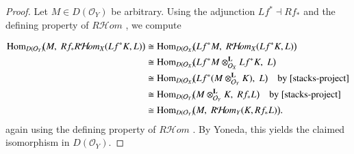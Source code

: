 \documentclass[11pt,twoside]{amsart}
\theoremstyle{plain}
\numberwithin{equation}{section}
\theoremstyle{definition}
\begin{document}
\begin{proof}
Let $M\in D(\mathcal O_Y)$ be arbitrary. Using the adjunction $Lf^*\dashv Rf_*$ \cite[Tag 07A6]{stacks-project}
and the defining property of $R\mathcal H\!om$ \cite[Tag 08J9]{stacks-project}, we compute

\begin{align*}
\operatorname{Hom}_{D(\mathcal O_Y)}\!\bigl(M,\;Rf_*R\mathcal H\!om_X(Lf^*K,L)\bigr)
&\cong \operatorname{Hom}_{D(\mathcal O_X)}\!\bigl(Lf^*M,\;R\mathcal H\!om_X(Lf^*K,L)\bigr) \\
&\cong \operatorname{Hom}_{D(\mathcal O_X)}\!\bigl(Lf^*M\otimes_{\mathcal O_X}^{\mathbf L}Lf^*K,\;L\bigr) \\
&\cong \operatorname{Hom}_{D(\mathcal O_X)}\!\bigl(Lf^*(M\otimes_{\mathcal O_Y}^{\mathbf L}K),\;L\bigr)
\quad\text{by \cite[Tag 07A4]{stacks-project}} \\
&\cong \operatorname{Hom}_{D(\mathcal O_Y)}\!\bigl(M\otimes_{\mathcal O_Y}^{\mathbf L}K,\;Rf_*L\bigr)
\quad\text{by \cite[Tag 07A6]{stacks-project}} \\
&\cong \operatorname{Hom}_{D(\mathcal O_Y)}\!\bigl(M,\;R\mathcal H\!om_Y(K,Rf_*L)\bigr).
\end{align*}
again using the defining property of $R\mathcal H\!om$ \cite[Tag 08J9]{stacks-project}.
By Yoneda, this yields the claimed isomorphism in $D(\mathcal O_Y)$.
\end{proof}
\end{document}
